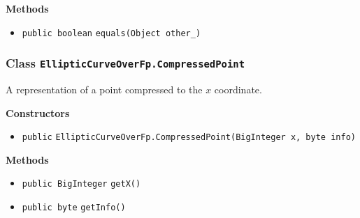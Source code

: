 \textbf{\sffamily Methods}
\begin{itemize}
\item \lstinline|public boolean| \lstinline|equals|\lstinline|(Object other_)| \\[-0.6em]




\end{itemize}

\subsubsection{Class \lstinline|EllipticCurveOverFp.CompressedPoint|}
A representation of a point compressed to the $x$ coordinate. \\
\noindent\begin{minipage}[t]{5cm}
\vspace{0.3em}
\hspace*{2em}
\vspace{0.3em}
\end{minipage}




\textbf{\sffamily Constructors}
\begin{itemize}
\item \lstinline|public| \lstinline|EllipticCurveOverFp.CompressedPoint|\lstinline|(BigInteger x, byte info)| \\[-0.6em]




\end{itemize}


\textbf{\sffamily Methods}
\begin{itemize}
\item \lstinline|public BigInteger| \lstinline|getX|\lstinline|()| \\[-0.6em]




\item \lstinline|public byte| \lstinline|getInfo|\lstinline|()| \\[-0.6em]




\end{itemize}

